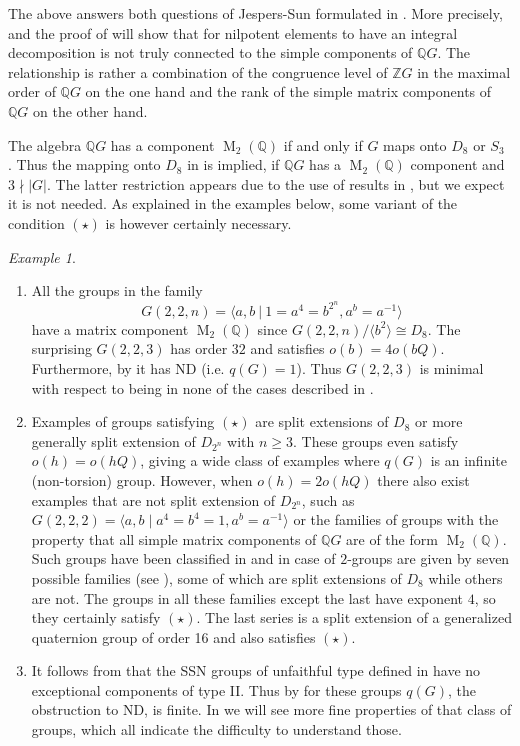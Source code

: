 \documentclass[a4paper,10pt]{amsart}
\theoremstyle{definition}
\theoremstyle{remark}
\newtheorem{example}[lemma]{Example}
\newcommand{\Ma}{\operatorname{M}}
\newcommand{\Z}{{\mathbb Z}}
\newcommand{\Q}{{\mathbb Q}}
\begin{document}
The above answers both questions of Jespers-Sun formulated in \cite[Section 6]{JespersSun}. More precisely,  and the proof of  will show that for nilpotent elements to have an integral decomposition is not truly connected to the simple components of $\Q G$. The relationship is rather a combination of the congruence level of $\Z G$ in the maximal order of $\Q G$ on the one hand and the rank of the simple matrix components of $\Q G$ on the other hand.

The algebra $\Q G$ has a component $\Ma_2(\Q)$ if and only if $G$ maps onto $D_8$ or $S_3$ \cite[Remark 6.17]{BJJKT2}. Thus the mapping onto $D_8$ in  is implied, if $\Q G$ has a $\Ma_2(\Q)$ component and $3 \nmid |G|$. The latter restriction appears due to the use of results in \cite[Section 10]{JJS}, but we expect it is not needed. As explained in the examples below, some variant of the condition $(\star)$ is however certainly necessary.

\begin{example}
\begin{enumerate}
\item All the groups in the family
$$G(2,2,n) = \langle a,b \ | \ 1 = a^{4} = b^{2^n}, a^b = a^{-1} \rangle$$
have a matrix component $\Ma_2(\Q)$ since $G(2,2,n)/\langle b^2 \rangle \cong D_8$. The surprising $G(2,2,3)$ has order $32$ and satisfies $o(b) = 4 o(bQ)$. Furthermore, by  it has ND (i.e. $q(G)=1$). Thus $G(2,2,3)$ is minimal with respect to being in none of the cases described in . 
\item Examples of groups satisfying $(\star)$ are split extensions of $D_8$ or more generally split extension of $D_{2^n}$ with $n\geq 3$. These groups even satisfy $o(h)= o(hQ)$, giving a wide class of examples where $q(G)$ is an infinite (non-torsion) group. However, when $o(h) = 2o(hQ)$ there also  exist examples that are not split extension of $D_{2^n}$, such as $G(2,2,2) = \langle a ,b \mid a^4 = b^4 =1, a^b = a^{-1}\rangle$ or the families of groups with the property that all simple matrix components of $\Q G$ are of the form $\Ma_2(\Q)$. Such groups have been classified in \cite{JesRioCrelle} and in case of $2$-groups are given by seven possible families (see \cite[Section 10.3]{JJS}), some of which are split extensions of $D_8$ while others are not. The groups in all these families except the last have exponent $4$, so they certainly satisfy $(\star)$. The last series is a split extension of a generalized quaternion group of order 16 and also satisfies $(\star)$.
\item It follows from \cite[Section 5.2]{JespersSun} that the SSN groups of unfaithful type defined in  have no exceptional components of type II. Thus by  for these groups $q(G)$, the obstruction to ND, is finite. In   we will see more fine properties of that class of groups, which all indicate the difficulty to understand those. 

\end{enumerate}
\end{example}
\end{document}
